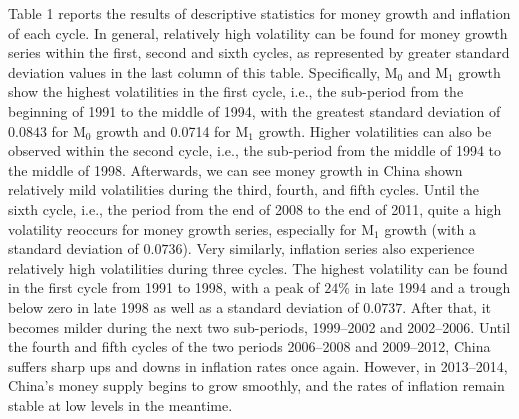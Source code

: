 \documentclass[a4paper,fleqn]{cas-sc}
\begin{document}
Table 1 reports the results of descriptive statistics for money growth and inflation of each cycle. In general, relatively high volatility can be found for money growth series within the first, second and sixth cycles, as represented by greater standard deviation values in the last column of this table. Specifically, M$_0$ and M$_1$ growth show the highest volatilities in the first cycle, i.e., the sub-period from the beginning of 1991 to the middle of 1994, with the greatest standard deviation of $0.0843$ for M$_0$ growth and 0.0714 for M$_1$ growth. Higher volatilities can also be observed within the second cycle, i.e., the sub-period from the middle of 1994 to the middle of 1998. Afterwards, we can see money growth in China shown relatively mild volatilities during the third, fourth, and fifth cycles. Until the sixth cycle, i.e., the period from the end of 2008 to the end of 2011, quite a high volatility reoccurs for money growth series, especially for M$_1$ growth (with a standard deviation of $0.0736$). Very similarly, inflation series also experience relatively high volatilities during three cycles. The highest volatility can be found in the first cycle from 1991 to 1998, with a peak of $24\%$ in late 1994 and a trough below zero in late 1998 as well as a standard deviation of $0.0737$. After that, it becomes milder during the next two sub-periods, 1999–2002 and 2002–2006. Until the fourth and fifth cycles of the two periods 2006–2008 and 2009–2012, China suffers sharp ups and downs in inflation rates once again. However, in 2013–2014, China's money supply begins to grow smoothly, and the rates of inflation remain stable at low levels in the meantime.
\end{document}

